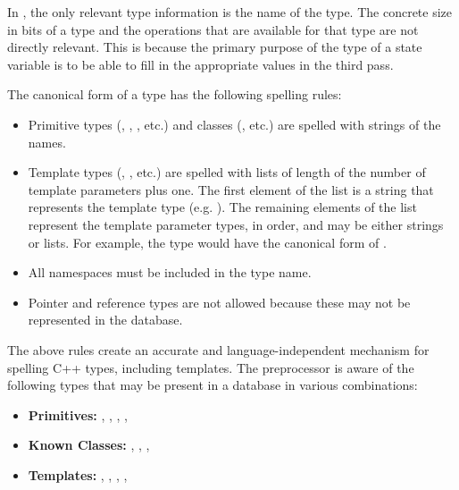 In \cycpp, the only relevant type information is the name of the type. 
The concrete size in bits
of a type and the operations that are available for that type are not directly 
relevant. This is because the primary purpose of the type of a state variable is
to be able to fill in the appropriate values in the third pass. 

The canonical form of a type has the following spelling rules:
\begin{itemize}
    \item Primitive types (, , , etc.) 
          and classes (, etc.) are spelled with strings 
          of the names.
    \item Template types (, , etc.) are spelled 
          with lists of length of the number of template parameters plus one.
          The first element of the list is a string that represents the 
          template type (e.g. ). The remaining elements of 
          the list represent the template parameter types, in order, and may 
          be either strings or lists.  For example, the type 
           would have the canonical form 
          of .
    \item All namespaces must be included in the type name.
    \item Pointer and reference types are not allowed because these may not be 
          represented in the database.
\end{itemize}

The above rules create an accurate and language-independent
mechanism for spelling C++ types, including templates. The preprocessor is aware
of the following types that may be present in a \cyclus database in various 
combinations:
\begin{itemize}
    \item \textbf{Primitives:} , , , , 
    \item \textbf{Known Classes:} , , 
                                  , 
    \item \textbf{Templates:} , , , 
                              , 
\end{itemize}

